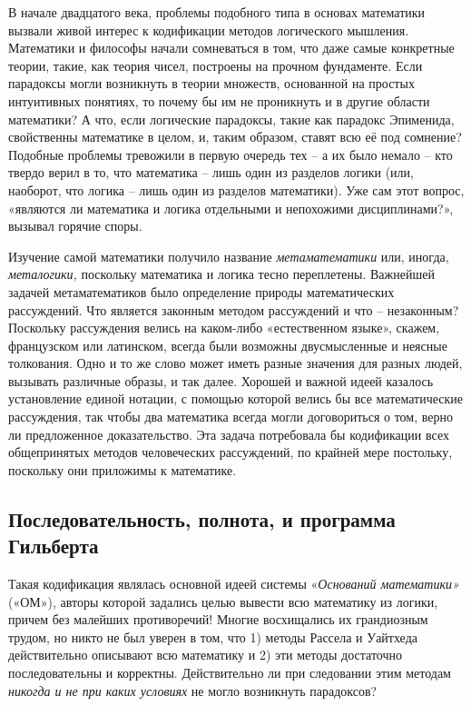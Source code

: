 \documentclass[../main.tex]{subfiles}
\begin{document}
В начале двадцатого века, проблемы подобного типа в основах математики вызвали живой интерес к кодификации методов логического мышления. Математики и философы начали сомневаться в том, что даже самые конкретные теории, такие, как теория чисел, построены на прочном фундаменте. Если парадоксы могли возникнуть в теории множеств, основанной на простых интуитивных понятиях, то почему бы им не проникнуть и в другие области математики? А что, если логические парадоксы, такие как парадокс Эпименида, свойственны математике в целом, и, таким образом, ставят всю её под сомнение? Подобные проблемы тревожили в первую очередь тех \--- а их было немало \--- кто твердо верил в то, что математика \--- лишь один из разделов логики (или, наоборот, что логика \--- лишь один из разделов математики). Уже сам этот вопрос, «являются ли математика и логика отдельными и непохожими дисциплинами?», вызывал горячие споры.

Изучение самой математики получило название \emph{метаматематики} или, иногда, \emph{металогики,} поскольку математика и логика тесно переплетены. Важнейшей задачей метаматематиков было определение природы математических рассуждений. Что является законным методом рассуждений и что \--- незаконным? Поскольку рассуждения велись на каком-либо «естественном языке», скажем, французском или латинском, всегда были возможны двусмысленные и неясные толкования. Одно и то же слово может иметь разные значения для разных людей, вызывать различные образы, и так далее. Хорошей и важной идеей казалось установление единой нотации, с помощью которой велись бы все математические рассуждения, так чтобы два математика всегда могли договориться о том, верно ли предложенное доказательство. Эта задача потребовала бы кодификации всех общепринятых методов человеческих рассуждений, по крайней мере постольку, поскольку они приложимы к математике.


\subsection{Последовательность, полнота, и программа Гильберта}

Такая кодификация являлась основной идеей системы «\emph{Оснований математики»} («ОМ»), авторы которой задались целью вывести всю математику из логики, причем без малейших противоречий! Многие восхищались их грандиозным трудом, но никто не был уверен в том, что 1) методы Рассела и Уайтхеда действительно описывают всю математику и 2) эти методы достаточно последовательны и корректны. Действительно ли при следовании этим методам \emph{никогда и не при каких условиях} не могло возникнуть парадоксов?
\end{document}
